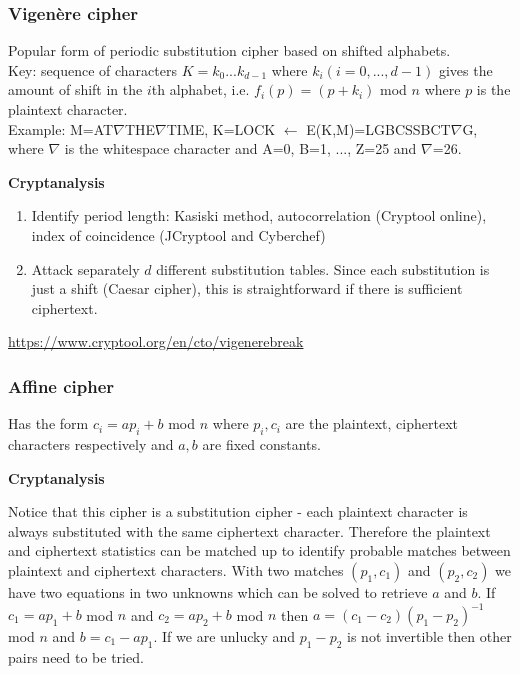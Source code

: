 \documentclass{article}
\begin{document}
\subsubsection{Vigenère cipher}

Popular form of periodic substitution cipher based on shifted alphabets.\\
Key: sequence of characters $K=k_0 ... k_{d-1}$ where $k_i (i=0,...,d-1)$ gives the amount of shift in the $i$th alphabet, i.e. $f_i (p)= (p+k_i)$ mod $n$ where $p$ is the plaintext character.\\
Example: M=AT$\nabla$THE$\nabla$TIME, K=LOCK $\leftarrow$ E(K,M)=LGBCSSBCT$\nabla$G, where $\nabla$ is the whitespace character and A=0, B=1, ..., Z=25 and $\nabla$=26.

\textbf{Cryptanalysis}

\begin{enumerate}
    \item Identify period length: Kasiski method, autocorrelation (Cryptool online), index of coincidence (JCryptool and Cyberchef)
    \item Attack separately $d$ different substitution tables. Since each substitution is just a shift (Caesar cipher), this is straightforward if there is sufficient ciphertext.
\end{enumerate}

\url{https://www.cryptool.org/en/cto/vigenerebreak}


\subsubsection{Affine cipher}

Has the form $c_i=a p_i + b$ mod $n$ where $p_i, c_i$ are the plaintext, ciphertext characters respectively and $a, b$ are fixed constants.

\textbf{Cryptanalysis}

Notice that this cipher is a substitution cipher - each plaintext character is always substituted with the same ciphertext character.  Therefore the plaintext and ciphertext statistics can be matched up to identify probable matches  between  plaintext  and  ciphertext  characters.   With  two  matches $(p_1, c_1)$ and $(p_2, c_2)$ we  have  two equations in two unknowns which can be solved to retrieve $a$ and $b$. If $c_1 = a p_1 + b$ mod $n$ and $c_2 = a p_2 + b$ mod $n$ then $a= (c_1 - c_2)(p_1 - p_2)^{-1}$ mod $n$ and $b=c_1 - a p_1$. If we are unlucky and $p_1 - p_2$ is not invertible then other pairs need to be tried.
\end{document}
